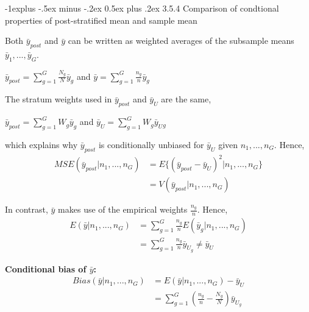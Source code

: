 \documentclass[10pt,landscape]{article}
\makeatletter
\renewcommand{\subsection}{\@startsection{subsection}{2}{0mm}%
                                {-1explus -.5ex minus -.2ex}%
                                {0.5ex plus .2ex}%
                                {\normalfont\normalsize\bfseries}}
\makeatother
\begin{document}
\begin{multicols}{3}
\subsection{3.5.4 Comparison of condtional properties of post-stratified mean and sample mean}

Both $\bar{y}_{post}$ and $\bar{y}$ can be written as weighted averages of the subsample means $\bar{y}_{1}, ..., \bar{y}_{G}$.
\begin{center}
  $\bar{y}_{post} =  \sum_{g=1}^{G}\frac{N_{g}}{N}\bar{y}_{g}$ and $\bar{y} = \sum_{g=1}^{G}\frac{n_{g}}{n}\bar{y}_{g}$
\end{center}

The stratum weights used in $\bar{y}_{post}$ and $\bar{y}_{U}$ are the same,

\begin{center}
  $\bar{y}_{post} = \sum_{g=1}^{G}W_{g}\bar{y}_{g}$ and $\bar{y}_{U} = \sum_{g=1}^{G}W_{g}\bar{y}_U{_{g}}$
\end{center}

which explains why $\bar{y}_{post}$ is conditionally unbiased for $\bar{y}_{U}$ given $n_{1},...,n_{G}$. Hence,
\begin{equation}
  \begin{split}
    MSE(\bar{y}_{post} | n_{1},...,n_{G}) &= E\{(\bar{y}_{post} - \bar{y}_{U})^{2} | n_{1},...,n_{G}\} \\
    &= V(\bar{y}_{post} | n_{1},...,n_{G})
  \end{split}
\end{equation}

In contrast, $\bar{y}$ makes use of the empirical weights $\frac{n_{g}}{n}$. Hence,
\begin{equation}
  \begin{split}
    E(\bar{y} | n_{1},...,n_{G}) &= \sum_{g=1}^{G}\frac{n_{g}}{n}E(\bar{y}_{g} | n_{1},...,n_{G}) \\
    &= \sum_{g=1}^{G}\frac{n_{g}}{n}\bar{y}_{U_{g}} \neq \bar{y}_{U}
  \end{split}
\end{equation}

\textbf{Conditional bias of $\bar{y}$:}
\begin{equation}
  \begin{split}
    Bias(\bar{y} | n_{1},...,n_{G}) &= E(\bar{y} | n_{1},...,n_{G}) - \bar{y}_{U} \\
    &= \sum_{g=1}^{G}(\frac{n_{g}}{n} - \frac{N_{g}}{N}) \bar{y}_{U_{g}}
  \end{split}
\end{equation}


\end{multicols}
\end{document}
